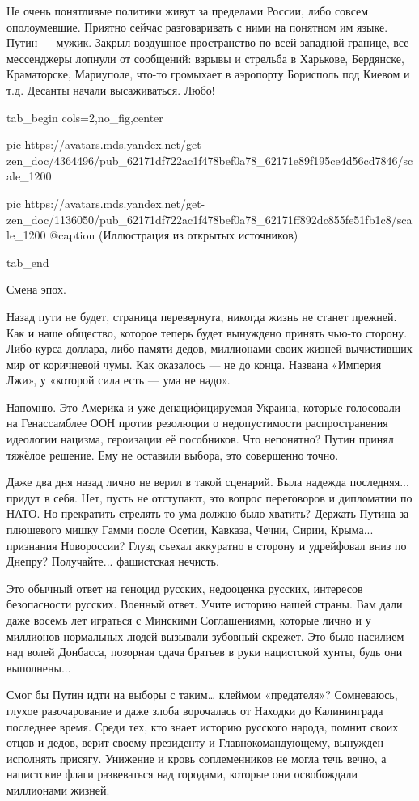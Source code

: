 Не очень понятливые политики живут за пределами России, либо совсем
ополоумевшие. Приятно сейчас разговаривать с ними на понятном им языке. Путин —
мужик. Закрыл воздушное пространство по всей западной границе, все мессенджеры
лопнули от сообщений: взрывы и стрельба в Харькове, Бердянске, Краматорске,
Мариуполе, что-то громыхает в аэропорту Борисполь под Киевом и т.д. Десанты
начали высаживаться. Любо!


\ifcmt
  tab_begin cols=2,no_fig,center

     pic https://avatars.mds.yandex.net/get-zen_doc/4364496/pub_62171df722ac1f478bef0a78_62171e89f195ce4d56cd7846/scale_1200

		 pic https://avatars.mds.yandex.net/get-zen_doc/1136050/pub_62171df722ac1f478bef0a78_62171ff892dc855fe51fb1c8/scale_1200
		 @caption (Иллюстрация из открытых источников)

  tab_end
\fi

Смена эпох.

Назад пути не будет, страница перевернута, никогда жизнь не станет прежней. Как
и наше общество, которое теперь будет вынуждено принять чью-то сторону. Либо
курса доллара, либо памяти дедов, миллионами своих жизней вычистивших мир от
коричневой чумы. Как оказалось — не до конца. Названа «Империя Лжи», у «которой
сила есть — ума не надо».

Напомню. Это Америка и уже денацифицируемая Украина, которые голосовали на
Генассамблее ООН против резолюции о недопустимости распространения идеологии
нацизма, героизации её пособников. Что непонятно? Путин принял тяжёлое решение.
Ему не оставили выбора, это совершенно точно.

Даже два дня назад лично не верил в такой сценарий. Была надежда последняя...
придут в себя. Нет, пусть не отступают, это вопрос переговоров и дипломатии по
НАТО. Но прекратить стрелять-то ума должно было хватить? Держать Путина за
плюшевого мишку Гамми после Осетии, Кавказа, Чечни, Сирии, Крыма... признания
Новороссии? Глузд съехал аккуратно в сторону и удрейфовал вниз по Днепру?
Получайте... фашистская нечисть.

Это обычный ответ на геноцид русских, недооценка русских, интересов
безопасности русских. Военный ответ. Учите историю нашей страны. Вам дали даже
восемь лет играться с Минскими Соглашениями, которые лично и у миллионов
нормальных людей вызывали зубовный скрежет. Это было насилием над волей
Донбасса, позорная сдача братьев в руки нацистской хунты, будь они выполнены...

Смог бы Путин идти на выборы с таким… клеймом «предателя»? Сомневаюсь, глухое
разочарование и даже злоба ворочалась от Находки до Калининграда последнее
время. Среди тех, кто знает историю русского народа, помнит своих отцов и
дедов, верит своему президенту и Главнокомандующему, вынужден исполнять
присягу. Унижение и кровь соплеменников не могла течь вечно, а нацистские флаги
развеваться над городами, которые они освобождали миллионами жизней.

